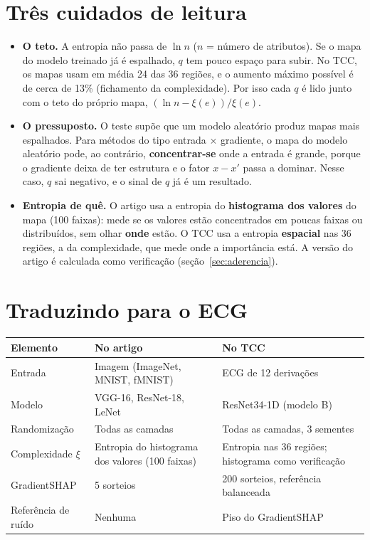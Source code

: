 \documentclass[11pt,a4paper]{article}
\begin{document}
\section{Três cuidados de leitura}
\begin{itemize}
\item \textbf{O teto.} A entropia não passa de $\ln n$ ($n$ = número de atributos). Se o mapa do modelo treinado já é espalhado, $q$ tem pouco espaço para subir. No TCC, os mapas usam em média 24 das 36 regiões, e o aumento máximo possível é de cerca de 13\% (fichamento da complexidade). Por isso cada $q$ é lido junto com o teto do próprio mapa, $(\ln n - \xi(e))/\xi(e)$.
\item \textbf{O pressuposto.} O teste supõe que um modelo aleatório produz mapas mais espalhados. Para métodos do tipo entrada $\times$ gradiente, o mapa do modelo aleatório pode, ao contrário, \textbf{concentrar-se} onde a entrada é grande, porque o gradiente deixa de ter estrutura e o fator $x - x'$ passa a dominar. Nesse caso, $q$ sai negativo, e o sinal de $q$ já é um resultado.
\item \textbf{Entropia de quê.} O artigo usa a entropia do \textbf{histograma dos valores} do mapa (100 faixas): mede se os valores estão concentrados em poucas faixas ou distribuídos, sem olhar \textbf{onde} estão. O TCC usa a entropia \textbf{espacial} nas 36 regiões, a da complexidade, que mede onde a importância está. A versão do artigo é calculada como verificação (seção~\ref{sec:aderencia}).
\end{itemize}

\section{Traduzindo para o ECG}
\begin{center}\small
\begin{tabularx}{\linewidth}{lXX}
\toprule
\textbf{Elemento} & \textbf{No artigo} & \textbf{No TCC} \\
\midrule
Entrada & Imagem (ImageNet, MNIST, fMNIST) & ECG de 12 derivações \\
Modelo & VGG-16, ResNet-18, LeNet & ResNet34-1D (modelo B) \\
Randomização & Todas as camadas & Todas as camadas, 3 sementes \\
Complexidade $\xi$ & Entropia do histograma dos valores (100 faixas) & Entropia nas 36 regiões; histograma como verificação \\
GradientSHAP & 5 sorteios & 200 sorteios, referência balanceada \\
Referência de ruído & Nenhuma & Piso do GradientSHAP \\
\bottomrule
\end{tabularx}
\end{center}
\end{document}

